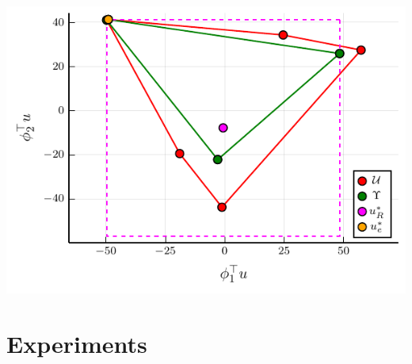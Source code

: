 \documentclass{beamer}
\begin{document}
\begin{frame}
	\begin{center}
		\includegraphics[width=\textwidth, height=\textheight]{../../pres_roil/plots/visual_solve_cheb.pdf}
	\end{center}
\end{frame}

\section*{Experiments}
\end{document}
